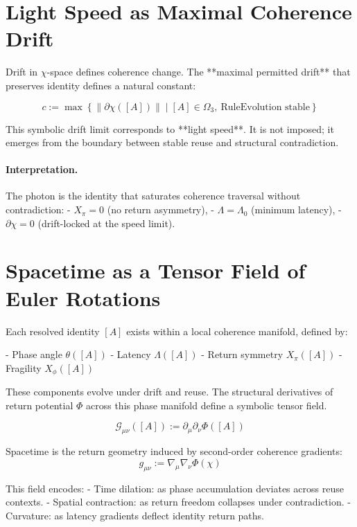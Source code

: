 \section{Light Speed as Maximal Coherence Drift}

Drift in $\chi$-space defines coherence change. The **maximal permitted drift** that preserves identity defines a natural constant:

\[
c := \max\left\{ \|\partial \chi([A])\| \mid [A] \in \Omega_3,\ \text{RuleEvolution stable} \right\}
\]

This symbolic drift limit corresponds to **light speed**. It is not imposed; it emerges from the boundary between stable reuse and structural contradiction.

\paragraph{Interpretation.}
The photon is the identity that saturates coherence traversal without contradiction:
- $X_\pi = 0$ (no return asymmetry),
- $\Lambda = \Lambda_0$ (minimum latency),
- $\partial \chi = 0$ (drift-locked at the speed limit).

\section{Spacetime as a Tensor Field of Euler Rotations}

Each resolved identity $[A]$ exists within a local coherence manifold, defined by:

- Phase angle $\theta([A])$
- Latency $\Lambda([A])$
- Return symmetry $X_\pi([A])$
- Fragility $X_\phi([A])$

These components evolve under drift and reuse. The structural derivatives of return potential $\Phi$ across this phase manifold define a symbolic tensor field.

\[
\mathcal{G}_{\mu\nu}([A]) := \partial_\mu \partial_\nu \Phi([A])
\]

\begin{definition}
Spacetime is the return geometry induced by second-order coherence gradients:
\[
g_{\mu\nu} := \nabla_\mu \nabla_\nu \Phi(\chi)
\]
\end{definition}

This field encodes:
- Time dilation: as phase accumulation deviates across reuse contexts.
- Spatial contraction: as return freedom collapses under contradiction.
- Curvature: as latency gradients deflect identity return paths.

